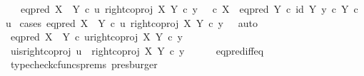 \begin{isabellebody}
\ \ \ {\isachardoublequoteopen}eq{\isacharunderscore}{\kern0pt}pred\ {\isacharparenleft}{\kern0pt}X\ {\isasymCoprod}\ Y{\isacharparenright}{\kern0pt}\ {\isasymcirc}\isactrlsub c\ {\isasymlangle}u{\isacharcomma}{\kern0pt}\ right{\isacharunderscore}{\kern0pt}coproj\ X\ Y\ {\isasymcirc}\isactrlsub c\ y{\isasymrangle}\ {\isacharequal}{\kern0pt}\ {\isacharparenleft}{\kern0pt}{\isacharparenleft}{\kern0pt}{\isasymf}\ {\isasymcirc}\isactrlsub c\ {\isasymbeta}\isactrlbsub X\isactrlesub {\isacharparenright}{\kern0pt}\ {\isasymamalg}\ {\isacharparenleft}{\kern0pt}eq{\isacharunderscore}{\kern0pt}pred\ Y\ {\isasymcirc}\isactrlsub c\ {\isasymlangle}id\ Y{\isacharcomma}{\kern0pt}\ y\ {\isasymcirc}\isactrlsub c\ {\isasymbeta}\isactrlbsub Y\isactrlesub {\isasymrangle}{\isacharparenright}{\kern0pt}{\isacharparenright}{\kern0pt}\ {\isasymcirc}\isactrlsub c\ u{\isachardoublequoteclose}\isanewline
%
\isadelimproof
%
\endisadelimproof
%
\isatagproof
{}\isamarkupfalse%
\ {\isacharparenleft}{\kern0pt}cases\ {\isachardoublequoteopen}eq{\isacharunderscore}{\kern0pt}pred\ {\isacharparenleft}{\kern0pt}X\ {\isasymCoprod}\ Y{\isacharparenright}{\kern0pt}\ {\isasymcirc}\isactrlsub c\ {\isasymlangle}u{\isacharcomma}{\kern0pt}\ right{\isacharunderscore}{\kern0pt}coproj\ X\ Y\ {\isasymcirc}\isactrlsub c\ y{\isasymrangle}\ {\isacharequal}{\kern0pt}\ {\isasymt}{\isachardoublequoteclose}{\isacharcomma}{\kern0pt}\ auto{\isacharparenright}{\kern0pt}\isanewline
\ \ \isamarkupfalse%
\ {\isachardoublequoteopen}eq{\isacharunderscore}{\kern0pt}pred\ {\isacharparenleft}{\kern0pt}X\ {\isasymCoprod}\ Y{\isacharparenright}{\kern0pt}\ {\isasymcirc}\isactrlsub c\ {\isasymlangle}u{\isacharcomma}{\kern0pt}right{\isacharunderscore}{\kern0pt}coproj\ X\ Y\ {\isasymcirc}\isactrlsub c\ y{\isasymrangle}\ {\isacharequal}{\kern0pt}\ {\isasymt}{\isachardoublequoteclose}\isanewline
\ \ \isamarkupfalse%
\ \isamarkupfalse%
\ u{\isacharunderscore}{\kern0pt}is{\isacharunderscore}{\kern0pt}right{\isacharunderscore}{\kern0pt}coproj{\isacharcolon}{\kern0pt}\ {\isachardoublequoteopen}u\ {\isacharequal}{\kern0pt}\ right{\isacharunderscore}{\kern0pt}coproj\ X\ Y\ {\isasymcirc}\isactrlsub c\ y{\isachardoublequoteclose}\isanewline
\ \ \ \ \isamarkupfalse%
\ eq{\isacharunderscore}{\kern0pt}pred{\isacharunderscore}{\kern0pt}iff{\isacharunderscore}{\kern0pt}eq\ \isamarkupfalse%
\ {\isacharparenleft}{\kern0pt}typecheck{\isacharunderscore}{\kern0pt}cfuncs{\isacharunderscore}{\kern0pt}prems{\isacharcomma}{\kern0pt}\ presburger{\isacharparenright}{\kern0pt}\isanewline

\end{isabellebody}
